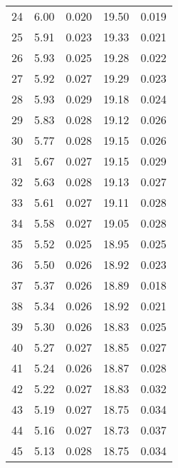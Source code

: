 \begin{table}
\begin{tabular}{c|ll|ll}
24 & 6.00 & 0.020 & 19.50 & 0.019 \\
25 & 5.91 & 0.023 & 19.33 & 0.021 \\
26 & 5.93 & 0.025 & 19.28 & 0.022 \\
27 & 5.92 & 0.027 & 19.29 & 0.023 \\
28 & 5.93 & 0.029 & 19.18 & 0.024 \\
29 & 5.83 & 0.028 & 19.12 & 0.026 \\
30 & 5.77 & 0.028 & 19.15 & 0.026 \\
31 & 5.67 & 0.027 & 19.15 & 0.029 \\
32 & 5.63 & 0.028 & 19.13 & 0.027 \\
33 & 5.61 & 0.027 & 19.11 & 0.028 \\
34 & 5.58 & 0.027 & 19.05 & 0.028 \\
35 & 5.52 & 0.025 & 18.95 & 0.025 \\
36 & 5.50 & 0.026 & 18.92 & 0.023 \\
37 & 5.37 & 0.026 & 18.89 & 0.018 \\
38 & 5.34 & 0.026 & 18.92 & 0.021 \\
39 & 5.30 & 0.026 & 18.83 & 0.025 \\
40 & 5.27 & 0.027 & 18.85 & 0.027 \\
41 & 5.24 & 0.026 & 18.87 & 0.028 \\
42 & 5.22 & 0.027 & 18.83 & 0.032 \\
43 & 5.19 & 0.027 & 18.75 & 0.034 \\
44 & 5.16 & 0.027 & 18.73 & 0.037 \\
45 & 5.13 & 0.028 & 18.75 & 0.034 \\
               \hline
        \end{tabular}
    \end{table}
    \clearpage

